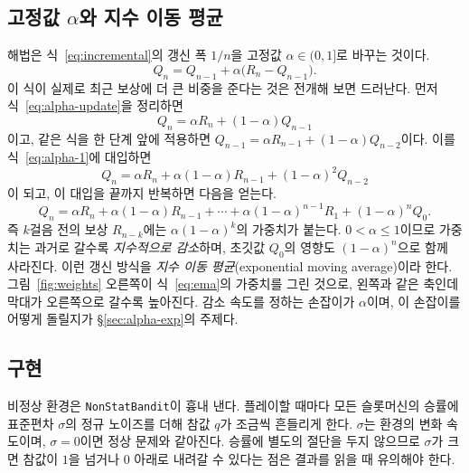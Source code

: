 \documentclass[11pt,a4paper]{article}
\newcommand{\qt}{q}                       %
\newcommand{\Qe}{Q}                       %
\begin{document}
\subsection{고정값 $\alpha$와 지수 이동 평균}

해법은 식~\eqref{eq:incremental}의 갱신 폭 $1/n$을 고정값 $\alpha\in(0,1]$로 바꾸는 것이다.
\begin{equation}
  \Qe_n = \Qe_{n-1} + \alpha\bigl(R_n - \Qe_{n-1}\bigr).
  \label{eq:alpha-update}
\end{equation}
이 식이 실제로 최근 보상에 더 큰 비중을 준다는 것은 전개해 보면 드러난다. 먼저
식~\eqref{eq:alpha-update}을 정리하면
\begin{equation}
  \Qe_n = \alpha R_n + (1-\alpha)\Qe_{n-1}
  \label{eq:alpha-1}
\end{equation}
이고, 같은 식을 한 단계 앞에 적용하면 $\Qe_{n-1} = \alpha R_{n-1} + (1-\alpha)\Qe_{n-2}$이다.
이를 식~\eqref{eq:alpha-1}에 대입하면
\begin{equation}
  \Qe_n = \alpha R_n + \alpha(1-\alpha)R_{n-1} + (1-\alpha)^2 \Qe_{n-2}
\end{equation}
이 되고, 이 대입을 끝까지 반복하면 다음을 얻는다.
\begin{equation}
  \Qe_n = \alpha R_n + \alpha(1-\alpha)R_{n-1} + \cdots
          + \alpha(1-\alpha)^{n-1}R_1 + (1-\alpha)^n \Qe_0.
  \label{eq:ema}
\end{equation}
즉 $k$걸음 전의 보상 $R_{n-k}$에는 $\alpha(1-\alpha)^k$의 가중치가 붙는다. $0<\alpha\le 1$이므로
가중치는 과거로 갈수록 \emph{지수적으로 감소}하며, 초깃값 $\Qe_0$의 영향도 $(1-\alpha)^n$으로 함께
사라진다. 이런 갱신 방식을 \emph{지수 이동 평균}(exponential moving average)이라 한다.
그림~\ref{fig:weights} 오른쪽이 식~\eqref{eq:ema}의 가중치를 그린 것으로, 왼쪽과 같은 축인데 막대가
오른쪽으로 갈수록 높아진다. 감소 속도를 정하는 손잡이가 $\alpha$이며, 이 손잡이를 어떻게 돌릴지가
\S\ref{sec:alpha-exp}의 주제다.

\subsection{구현}

비정상 환경은 \texttt{NonStatBandit}이 흉내 낸다. 플레이할 때마다 모든 슬롯머신의 승률에 표준편차
$\sigma$의 정규 노이즈를 더해 참값 $\qt$가 조금씩 흔들리게 한다. $\sigma$는 환경의 변화 속도이며,
$\sigma=0$이면 정상 문제와 같아진다. 승률에 별도의 절단을 두지 않으므로 $\sigma$가 크면 참값이
$1$을 넘거나 $0$ 아래로 내려갈 수 있다는 점은 결과를 읽을 때 유의해야 한다.
\end{document}
